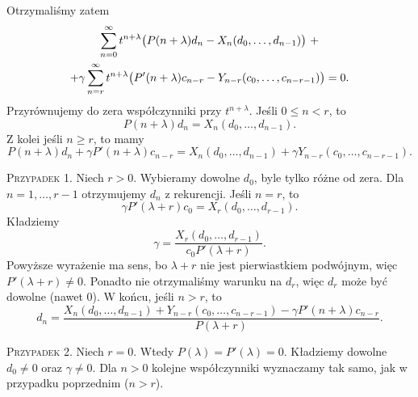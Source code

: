 %
Otrzymaliśmy zatem
%
\begin{multline*}
  \sum_{n=0}^{\infty} t^{n+\lambda} \p[\big]{ P(n+\lambda) d_n - X_n(d_0,\ldots,d_{n-1}) } \ + \\ +
  \gamma \sum_{n=r}^{\infty} t^{n+\lambda} \p[\big]{ P'(n+\lambda) c_{n-r} - Y_{n-r}(c_0,\ldots,c_{n-r-1}) } = 0.
\end{multline*}
%
Przyrównujemy do zera współczynniki przy $t^{n+\lambda}$. Jeśli $0 \leq n < r$, to
%
\begin{equation*}
  P(n+\lambda) d_n = X_n(d_0,\ldots,d_{n-1}).
\end{equation*}
%
Z kolei jeśli $n \geq r$, to mamy
%
\begin{equation*}
  P(n+\lambda) d_n + \gamma P'(n+\lambda) c_{n-r} = X_n(d_0,\ldots,d_{n-1}) + \gamma Y_{n-r}(c_0,\ldots,c_{n-r-1}).
\end{equation*}

\textsc{Przypadek 1.} Niech $r>0$. Wybieramy dowolne $d_0$, byle tylko różne od zera. Dla $n=1,\ldots,r-1$ otrzymujemy 
$d_n$ z rekurencji. Jeśli $n=r$, to
%
\begin{equation*}
  \gamma P'(\lambda+r) c_0 = X_r(d_0,\ldots,d_{r-1}).
\end{equation*}
%
Kładziemy
%
\begin{equation*}
  \gamma = \frac{X_r(d_0,\ldots,d_{r-1})}{c_0 P'(\lambda+r)}.
\end{equation*}
%
Powyższe wyrażenie ma sens, bo $\lambda+r$ nie jest pierwiastkiem podwójnym, więc $P'(\lambda+r) \not= 0$. Ponadto nie 
otrzymaliśmy warunku na $d_r$, więc $d_r$ może być dowolne (nawet $0$). W końcu, jeśli $n>r$, to
%
\begin{equation*}
  d_n = \frac{X_n(d_0,\ldots,d_{n-1}) + Y_{n-r}(c_0,\ldots,c_{n-r-1}) - \gamma P'(n+\lambda) c_{n-r}}{P(\lambda+r)}.
\end{equation*}

\textsc{Przypadek 2.} Niech $r=0$. Wtedy $P(\lambda) = P'(\lambda) = 0$. Kładziemy dowolne $d_0 \not= 0$ oraz $\gamma 
\not= 0$. Dla $n > 0$ kolejne współczynniki wyznaczamy tak samo, jak w przypadku poprzednim ($n>r$).
































